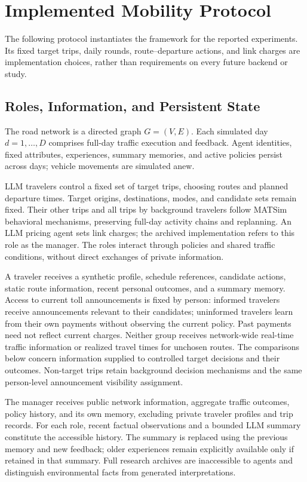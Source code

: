 \section{Implemented Mobility Protocol}
\label{app:concrete-protocol}

The following protocol instantiates the framework for the reported experiments. Its fixed target trips, daily rounds, route--departure actions, and link charges are implementation choices, rather than requirements on every future backend or study.

\subsection{Roles, Information, and Persistent State}
\label{sec:roles-state-implementation}

The road network is a directed graph $G=(V,E)$. Each simulated day $d=1,\ldots,D$ comprises full-day traffic execution and feedback. Agent identities, fixed attributes, experiences, summary memories, and active policies persist across days; vehicle movements are simulated anew.

LLM travelers control a fixed set of target trips, choosing routes and planned departure times. Target origins, destinations, modes, and candidate sets remain fixed. Their other trips and all trips by background travelers follow MATSim behavioral mechanisms, preserving full-day activity chains and replanning. An LLM pricing agent sets link charges; the archived implementation refers to this role as the manager. The roles interact through policies and shared traffic conditions, without direct exchanges of private information.

A traveler receives a synthetic profile, schedule references, candidate actions, static route information, recent personal outcomes, and a summary memory. Access to current toll announcements is fixed by person: informed travelers receive announcements relevant to their candidates; uninformed travelers learn from their own payments without observing the current policy. Past payments need not reflect current charges. Neither group receives network-wide real-time traffic information or realized travel times for unchosen routes. The comparisons below concern information supplied to controlled target decisions and their outcomes. Non-target trips retain background decision mechanisms and the same person-level announcement visibility assignment.

The manager receives public network information, aggregate traffic outcomes, policy history, and its own memory, excluding private traveler profiles and trip records. For each role, recent factual observations and a bounded LLM summary constitute the accessible history. The summary is replaced using the previous memory and new feedback; older experiences remain explicitly available only if retained in that summary. Full research archives are inaccessible to agents and distinguish environmental facts from generated interpretations.

